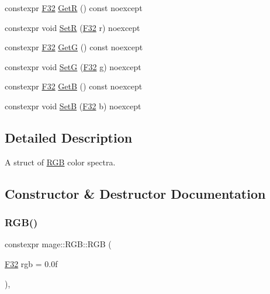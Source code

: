 \begin{DoxyCompactItemize}
\item 
constexpr \mbox{\hyperlink{namespacemage_aa97e833b45f06d60a0a9c4fc22ae02c0}{F32}} \mbox{\hyperlink{structmage_1_1_r_g_b_a314530cf81692c9f49da663ba51ea528}{GetR}} () const noexcept
\item 
constexpr void \mbox{\hyperlink{structmage_1_1_r_g_b_a1fc1a5b272202fb56f3a8f35735836d2}{SetR}} (\mbox{\hyperlink{namespacemage_aa97e833b45f06d60a0a9c4fc22ae02c0}{F32}} r) noexcept
\item 
constexpr \mbox{\hyperlink{namespacemage_aa97e833b45f06d60a0a9c4fc22ae02c0}{F32}} \mbox{\hyperlink{structmage_1_1_r_g_b_a997a18a9af34e5796d18974762574faf}{GetG}} () const noexcept
\item 
constexpr void \mbox{\hyperlink{structmage_1_1_r_g_b_a6a47f8186e29e29a9d253732e7071ed7}{SetG}} (\mbox{\hyperlink{namespacemage_aa97e833b45f06d60a0a9c4fc22ae02c0}{F32}} g) noexcept
\item 
constexpr \mbox{\hyperlink{namespacemage_aa97e833b45f06d60a0a9c4fc22ae02c0}{F32}} \mbox{\hyperlink{structmage_1_1_r_g_b_a5a48ef39436290969ed01021bdbb687d}{GetB}} () const noexcept
\item 
constexpr void \mbox{\hyperlink{structmage_1_1_r_g_b_a363d6235bc2c68907addb5326df07dc7}{SetB}} (\mbox{\hyperlink{namespacemage_aa97e833b45f06d60a0a9c4fc22ae02c0}{F32}} b) noexcept
\end{DoxyCompactItemize}


\subsection{Detailed Description}
A struct of \mbox{\hyperlink{structmage_1_1_r_g_b}{R\+GB}} color spectra. 

\subsection{Constructor \& Destructor Documentation}
\mbox{\label{structmage_1_1_r_g_b_a166d2c13b46f9518c132c68f1117e5c6}} 
\subsubsection{\texorpdfstring{R\+G\+B()}{RGB()}\hspace{0.1cm}{\footnotesize\ttfamily [1/7]}}
{\footnotesize\ttfamily constexpr mage\+::\+R\+G\+B\+::\+R\+GB (\begin{DoxyParamCaption}\item[{\mbox{\hyperlink{namespacemage_aa97e833b45f06d60a0a9c4fc22ae02c0}{F32}}}]{rgb = {\ttfamily 0.0f} }\end{DoxyParamCaption})\hspace{0.3cm}{\ttfamily [explicit]}, {\ttfamily [noexcept]}}

